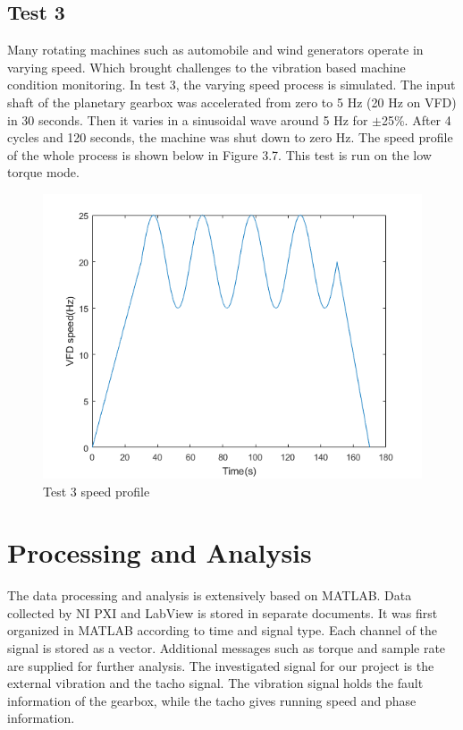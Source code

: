 \subsection{Test 3}

Many rotating machines such as automobile and wind generators operate in varying speed. Which brought challenges to the vibration based machine condition monitoring. In test 3, the varying speed process is simulated. The input shaft of the planetary gearbox was accelerated from zero to 5 Hz (20 Hz on VFD) in 30 seconds. Then it varies in a sinusoidal wave around 5 Hz for $\pm$25\%. After 4 cycles and 120 seconds, the machine was shut down to zero Hz. The speed profile of the whole process is shown below in Figure 3.7. This test is run on the low torque mode.

\begin{figure}[h]
	\centering
	\includegraphics[scale = 0.85]{test3}
	\caption{Test 3 speed profile}
	\label{test3}
\end{figure}

\section{Processing and Analysis}

The data processing and analysis is extensively based on MATLAB. Data collected by NI PXI and LabView is stored in separate documents. It was first organized in MATLAB according to time and signal type. Each channel of the signal is stored as a vector. Additional messages such as torque and sample rate are supplied for further analysis. The investigated signal for our project is the external vibration and the tacho signal. The vibration signal holds the fault information of the gearbox, while the tacho gives running speed and phase information.

